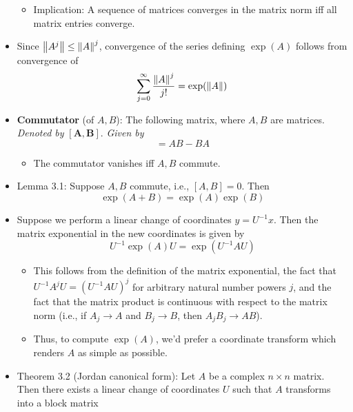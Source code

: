 \documentclass[../notes.tex]{subfiles}
\begin{document}
\begin{itemize}
    \begin{itemize}
        \item Implication: A sequence of matrices converges in the matrix norm iff all matrix entries converge.
    \end{itemize}
    \item Since $\norm{A^j}\leq\norm{A}^j$, convergence of the series defining $\exp(A)$ follows from convergence of
    \begin{equation*}
        \sum_{j=0}^\infty\frac{\norm{A}^j}{j!} = \exp(\norm{A})
    \end{equation*}
    \item \textbf{Commutator} (of $A,B$): The following matrix, where $A,B$ are matrices. \emph{Denoted by} $\bm{[A,B]}$. \emph{Given by}
    \begin{equation*}
        [A,B] = AB-BA
    \end{equation*}
    \begin{itemize}
        \item The commutator vanishes iff $A,B$ commute.
    \end{itemize}
    \item Lemma 3.1: Suppose $A,B$ commute, i.e., $[A,B]=0$. Then
    \begin{equation*}
        \exp(A+B) = \exp(A)\exp(B)
    \end{equation*}
    \item Suppose we perform a linear change of coordinates $y=U^{-1}x$. Then the matrix exponential in the new coordinates is given by
    \begin{equation*}
        U^{-1}\exp(A)U = \exp(U^{-1}AU)
    \end{equation*}
    \begin{itemize}
        \item This follows from the definition of the matrix exponential, the fact that $U^{-1}A^jU=(U^{-1}AU)^j$ for arbitrary natural number powers $j$, and the fact that the matrix product is continuous with respect to the matrix norm (i.e., if $A_j\to A$ and $B_j\to B$, then $A_jB_j\to AB$).
        \item Thus, to compute $\exp(A)$, we'd prefer a coordinate transform which renders $A$ as simple as possible.
    \end{itemize}
    \item Theorem 3.2 (Jordan canonical form): Let $A$ be a complex $n\times n$ matrix. Then there exists a linear change of coordinates $U$ such that $A$ transforms into a block matrix
    \begin{equation*}

\end{equation*}
\end{itemize}
\end{document}
